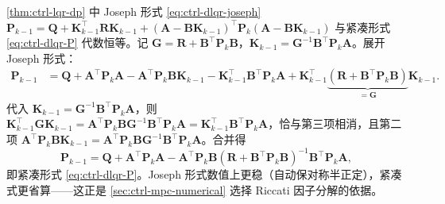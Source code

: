 \begin{derivation}
\cref{thm:ctrl-lqr-dp} 中 Joseph 形式 \cref{eq:ctrl-dlqr-joseph}
$\mathbf{P}_{k-1}=\mathbf{Q}+\mathbf{K}_{k-1}^\top\mathbf{R}\mathbf{K}_{k-1}+(\mathbf{A}-\mathbf{B}\mathbf{K}_{k-1})^\top\mathbf{P}_k(\mathbf{A}-\mathbf{B}\mathbf{K}_{k-1})$ 与紧凑形式 \cref{eq:ctrl-dlqr-P} 代数恒等。记 $\mathbf{G}=\mathbf{R}+\mathbf{B}^\top\mathbf{P}_k\mathbf{B}$，$\mathbf{K}_{k-1}=\mathbf{G}^{-1}\mathbf{B}^\top\mathbf{P}_k\mathbf{A}$。展开 Joseph 形式：
\begin{align*}
  \mathbf{P}_{k-1}&=\mathbf{Q}+\mathbf{A}^\top\mathbf{P}_k\mathbf{A}-\mathbf{A}^\top\mathbf{P}_k\mathbf{B}\mathbf{K}_{k-1}-\mathbf{K}_{k-1}^\top\mathbf{B}^\top\mathbf{P}_k\mathbf{A}
   +\mathbf{K}_{k-1}^\top\underbrace{(\mathbf{R}+\mathbf{B}^\top\mathbf{P}_k\mathbf{B})}_{=\mathbf{G}}\mathbf{K}_{k-1}.
\end{align*}
代入 $\mathbf{K}_{k-1}=\mathbf{G}^{-1}\mathbf{B}^\top\mathbf{P}_k\mathbf{A}$，则 $\mathbf{K}_{k-1}^\top\mathbf{G}\mathbf{K}_{k-1}=\mathbf{A}^\top\mathbf{P}_k\mathbf{B}\mathbf{G}^{-1}\mathbf{B}^\top\mathbf{P}_k\mathbf{A}=\mathbf{K}_{k-1}^\top\mathbf{B}^\top\mathbf{P}_k\mathbf{A}$，恰与第三项相消，且第二项 $\mathbf{A}^\top\mathbf{P}_k\mathbf{B}\mathbf{K}_{k-1}=\mathbf{A}^\top\mathbf{P}_k\mathbf{B}\mathbf{G}^{-1}\mathbf{B}^\top\mathbf{P}_k\mathbf{A}$。合并得
\[
  \mathbf{P}_{k-1}=\mathbf{Q}+\mathbf{A}^\top\mathbf{P}_k\mathbf{A}-\mathbf{A}^\top\mathbf{P}_k\mathbf{B}(\mathbf{R}+\mathbf{B}^\top\mathbf{P}_k\mathbf{B})^{-1}\mathbf{B}^\top\mathbf{P}_k\mathbf{A},
\]
即紧凑形式 \cref{eq:ctrl-dlqr-P}。Joseph 形式数值上更稳（自动保对称半正定），紧凑式更省算——这正是 \cref{sec:ctrl-mpc-numerical} 选择 Riccati 因子分解的依据。
\end{derivation}
